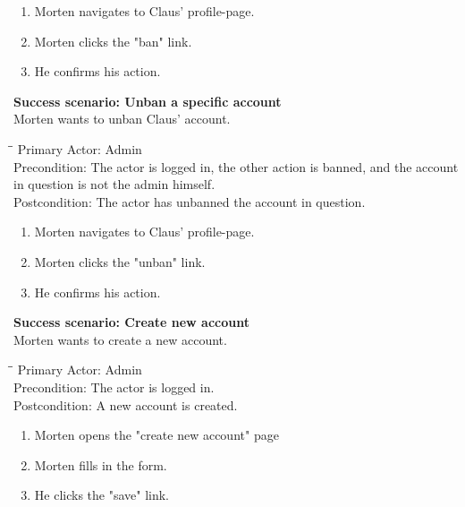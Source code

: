 \begin{enumerate} \setlength{\itemsep}{-1mm}
	\item Morten navigates to Claus' profile-page.
	\item Morten clicks the "ban" link.
	\item He confirms his action.
\end{enumerate}
\vspace{3mm}
\textbf{Success scenario: Unban a specific account} \\
Morten wants to unban Claus' account.
\begin{tabbing}
\hspace{5mm}\=\hspace{26mm}\=\kill
\>Primary Actor:\> Admin\\
\>Precondition:\> The actor is logged in, the other action is banned, and the account in question is not the admin himself.\\
\>Postcondition:\> The actor has unbanned the account in question.
\end{tabbing}
\begin{enumerate} \setlength{\itemsep}{-1mm}
	\item Morten navigates to Claus' profile-page.
	\item Morten clicks the "unban" link.
	\item He confirms his action.
\end{enumerate}
\vspace{3mm}
\textbf{Success scenario: Create new account} \\
Morten wants to create a new account.
\begin{tabbing}
\hspace{5mm}\=\hspace{26mm}\=\kill
\>Primary Actor:\> Admin\\
\>Precondition:\> The actor is logged in.\\
\>Postcondition:\> A new account is created.
\end{tabbing}
\begin{enumerate} \setlength{\itemsep}{-1mm}
	\item Morten opens the "create new account" page
	\item Morten fills in the form.
	\item He clicks the "save" link.
\end{enumerate}